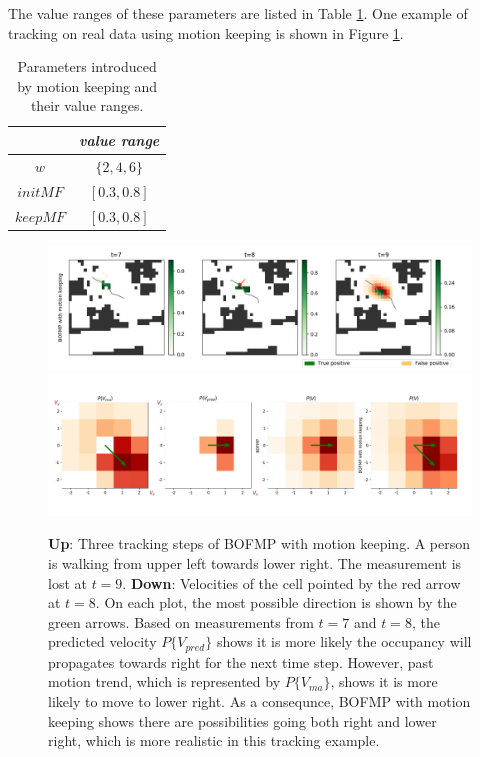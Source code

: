 The value ranges of these parameters are listed in Table \ref{table:motion_keeping_param_range}. One example of tracking on real data using motion keeping is shown in Figure \ref{fig:keep_motion_idea}.
\begin{table}[H]
\centering  
\begin{tabularx}{.3\textwidth}{c|c}
    \hline
      &  \textit{value range } \\ \hline
    $w$ & \( \{2, 4, 6\} \)  \\
     $initMF$ & \( [0.3, 0.8]\) \\  
     $keepMF$ & \( [0.3, 0.8]\) \\    
   \hline
  \end{tabularx}
\label{table:motion_keeping_param_range}
\caption{Parameters introduced by motion keeping and their value ranges.}
\end{table}

\begin{figure}[ht]
\centering
\includegraphics[width=\textwidth]{figures/moving_average_tracking.png}
\includegraphics[width=\textwidth]{figures/moving_average_tracking_velocities_1.png}
\caption{\textbf{Up}: Three tracking steps of BOFMP with motion keeping. A person is walking from upper left towards lower right. The measurement is lost at $t=9$. \textbf{Down}: Velocities of the cell pointed by the red arrow at $t=8$. On each plot, the most possible direction is shown by the green arrows. Based on measurements from $t=7$ and $t=8$, the predicted velocity $P\{V_{pred}\}$ shows it is more likely the occupancy will propagates towards right for the next time step. However, past motion trend, which is represented by $P\{V_{ma}\}$, shows it is more likely to move to lower right. As a consequnce, BOFMP with motion keeping shows there are possibilities going both right and lower right, which is more realistic in this tracking example.}
\label{fig:keep_motion_idea}
\end{figure}


